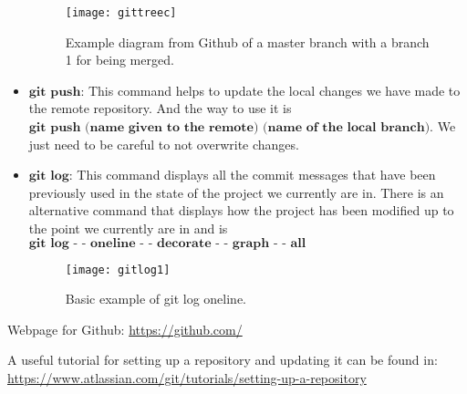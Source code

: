 \begin{itemize}
\begin{figure}[H]
\begin{center}
	\texttt{[image: gittreec]}

\caption{ Example diagram from Github of a master branch with a branch 1 for being merged.}
\label{fig:imggitpull}
\end{center}
\end{figure}

	\item $\textbf{git push:}$ This command helps to update the local changes we have made to the remote repository. And the way to use it is $\textbf{git push (name given to the remote) (name of the local branch)}$. We just need to be careful to not overwrite changes. 
	\item $\textbf{git log:}$  This command displays all the commit messages that have been previously used in the state of the project we currently are in. There is an alternative command that displays how the project has been modified up to the point we currently are in and is $\textbf{git log - - oneline  - - decorate - - graph - - all}$

\begin{figure}[H]
\begin{center}
	\texttt{[image: gitlog1]}

\caption{Basic example of git log oneline.}
\label{fig:imggitlog}
\end{center}
\end{figure}

\end{itemize}

Webpage for Github:
\url{https://github.com/}

A useful tutorial for setting up a repository and updating it can be found in:
\url{https://www.atlassian.com/git/tutorials/setting-up-a-repository}
